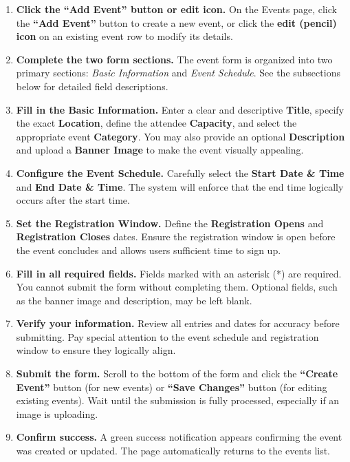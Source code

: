 \documentclass[12pt, a4paper]{article}
\begin{document}
\begin{enumerate}[leftmargin=1.5em]
  \item \textbf{Click the ``Add Event'' button or edit icon.} On the Events page, click the \textbf{``Add Event''} button to create a new event, or click the \textbf{edit (pencil) icon} on an existing event row to modify its details.

  \item \textbf{Complete the two form sections.} The event form is organized into two primary sections: \textit{Basic Information} and \textit{Event Schedule}. See the subsections below for detailed field descriptions.

  \item \textbf{Fill in the Basic Information.} Enter a clear and descriptive \textbf{Title}, specify the exact \textbf{Location}, define the attendee \textbf{Capacity}, and select the appropriate event \textbf{Category}. You may also provide an optional \textbf{Description} and upload a \textbf{Banner Image} to make the event visually appealing.

  \item \textbf{Configure the Event Schedule.} Carefully select the \textbf{Start Date \& Time} and \textbf{End Date \& Time}. The system will enforce that the end time logically occurs after the start time.

  \item \textbf{Set the Registration Window.} Define the \textbf{Registration Opens} and \textbf{Registration Closes} dates. Ensure the registration window is open before the event concludes and allows users sufficient time to sign up.

  \item \textbf{Fill in all required fields.} Fields marked with an asterisk (*) are required. You cannot submit the form without completing them. Optional fields, such as the banner image and description, may be left blank.

  \item \textbf{Verify your information.} Review all entries and dates for accuracy before submitting. Pay special attention to the event schedule and registration window to ensure they logically align.

  \item \textbf{Submit the form.} Scroll to the bottom of the form and click the \textbf{``Create Event''} button (for new events) or \textbf{``Save Changes''} button (for editing existing events). Wait until the submission is fully processed, especially if an image is uploading.

  \item \textbf{Confirm success.} A green success notification appears confirming the event was created or updated. The page automatically returns to the events list.
\end{enumerate}
\end{document}

